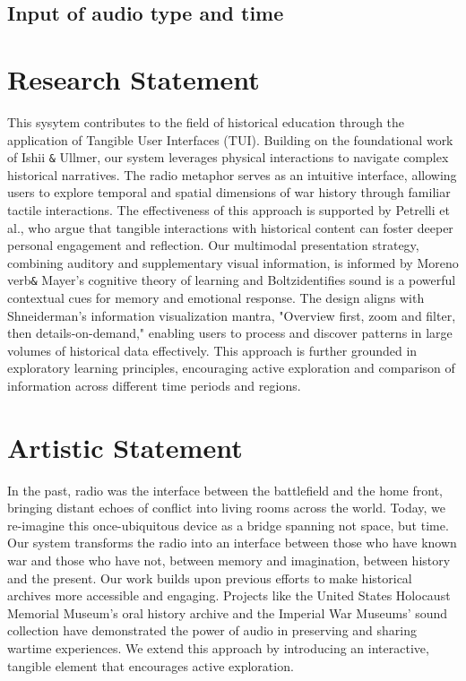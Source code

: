 \documentclass[sigconf,authordraft]{acmart}
\begin{document}
\subsection{Input of audio type and time}



\section{Research Statement}
This sysytem contributes to the field of historical education through the application of Tangible User Interfaces (TUI). Building on the foundational work of Ishii \verb|&| Ullmer, our system leverages physical interactions to navigate complex historical narratives\cite{tangible}. The radio metaphor serves as an intuitive interface, allowing users to explore temporal and spatial dimensions of war history through familiar tactile interactions. The effectiveness of this approach is supported by Petrelli et al.\cite{Petrelli}, who argue that tangible interactions with historical content can foster deeper personal engagement and reflection. 
Our multimodal presentation strategy, combining auditory and supplementary visual information, is informed by Moreno verb\verb|&| Mayer's cognitive theory of learning\cite{Moreno} and Boltz\cite{boltz}identifies sound is a powerful contextual cues for memory and emotional response.
The design aligns with Shneiderman's\cite{Mantra} information visualization mantra, "Overview first, zoom and filter, then details-on-demand," enabling users to process and discover patterns in large volumes of historical data effectively. This approach is further grounded in exploratory learning principles\cite{bruner}, encouraging active exploration and comparison of information across different time periods and regions.

\section{Artistic Statement}
In the past, radio was the interface between the battlefield and the home front, bringing distant echoes of conflict into living rooms across the world. Today, we re-imagine this once-ubiquitous device as a bridge spanning not space, but time. Our system transforms the radio into an interface between those who have known war and those who have not, between memory and imagination, between history and the present.
Our work builds upon previous efforts to make historical archives more accessible and engaging. Projects like the United States Holocaust Memorial Museum's oral history archive and the Imperial War Museums' sound collection have demonstrated the power of audio in preserving and sharing wartime experiences. We extend this approach by introducing an interactive, tangible element that encourages active exploration.
\end{document}
